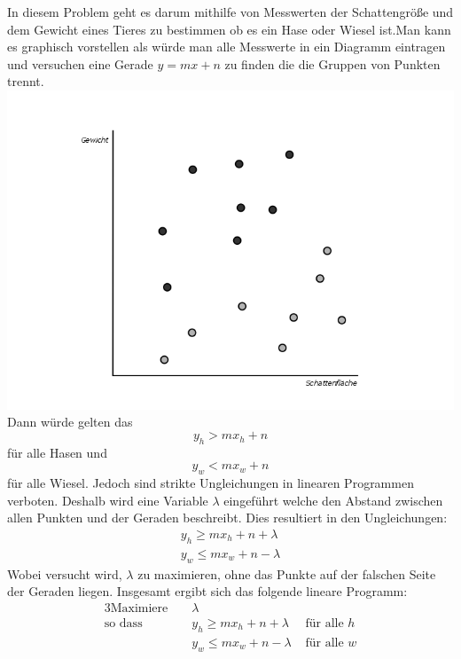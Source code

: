 In diesem Problem geht es darum mithilfe von Messwerten der Schattengröße und dem Gewicht eines Tieres zu bestimmen ob es ein Hase oder Wiesel ist.Man kann es graphisch vorstellen als würde man alle Messwerte in ein Diagramm eintragen und versuchen eine Gerade $y=mx+n$ zu finden die die Gruppen von Punkten trennt.
\includegraphics[width=\textwidth]{Grafiken/HaseWieselBild.png}
Dann würde gelten das \[y_h>mx_h+n\] für alle Hasen und \[
y_w<mx_w+n\] für alle Wiesel. Jedoch sind strikte Ungleichungen in linearen Programmen verboten. Deshalb wird eine Variable $\lambda$ eingeführt welche den Abstand zwischen allen Punkten und der Geraden beschreibt. Dies resultiert in den Ungleichungen:
\begin{align*}
	y_h\geq{}mx_h+n+\lambda\\
	y_w\leq{}mx_w+n-\lambda
\end{align*} 
Wobei versucht wird, $\lambda$ zu maximieren, ohne das Punkte auf der falschen Seite der Geraden liegen. Insgesamt ergibt sich das folgende lineare Programm:
\begin{alignat*}{3}
	\text{Maximiere }	   &&  \lambda&\\
	\text{so dass }&& y_h\geq{}mx_h+n+\lambda & \text{ für alle $h$}\\
				   &&y_w\leq{}mx_w+n-\lambda & \text{ für alle $w$}\\
\end{alignat*}
